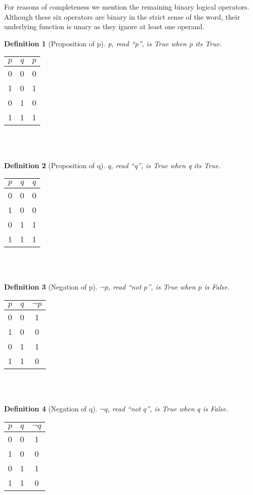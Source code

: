 \documentclass[10pt,a4paper,draft,titlepage,onecolumn]{book}
\newtheorem{definition}{Definition}[subsection]
\begin{document}
For reasons of completeness we mention the remaining binary logical operators.
Although these six operators are binary in the strict sense of the word, their underlying function is unary as they ignore at least one operand. 


\begin{definition}[Proposition of p] p, read ``p'', is True when p its True.
\end{definition}
\begin{tabular}{ |c|c|c| }
 \hline
 $p$ & $q$ &  $p$ \\
 \hline
 0 & 0 & 0 \\ 
 1 & 0 & 1\\
 0 & 1 & 0 \\
 1 & 1 & 1\\
 \hline
\end{tabular}\\\\


\begin{definition}[Proposition of q] q, read ``q'', is True when q its True.
\end{definition}
\begin{tabular}{ |c|c|c| }
 \hline
 $p$ & $q$ &  $q$ \\
 \hline
 0 & 0 & 0 \\ 
 1 & 0 & 0\\
 0 & 1 & 1 \\
 1 & 1 & 1\\
 \hline
\end{tabular}\\\\


\begin{definition}[Negation of p] ${\neg}p$, read ``not $p$'', is True when $p$ is False.
\end{definition}
\begin{tabular}{ |c|c|c| }
 \hline
 $p$ & $q$ &  ${\neg}p$  \\
 \hline
 0 & 0 & 1 \\
 1 & 0 & 0\\
 0 & 1 & 1\\
 1 & 1 & 0\\
 \hline
\end{tabular}\\\\

\begin{definition}[Negation of q] ${\neg}q$, read ``not $q$'', is True when $q$ is False.
\end{definition}
\begin{tabular}{ |c|c|c| }
 \hline
 $p$ & $q$ &  ${\neg}q$  \\
 \hline
 0 & 0 & 1 \\
 1 & 0 & 0\\
 0 & 1 & 1\\
 1 & 1 & 0\\
 \hline
\end{tabular}\\\\
\end{document}
